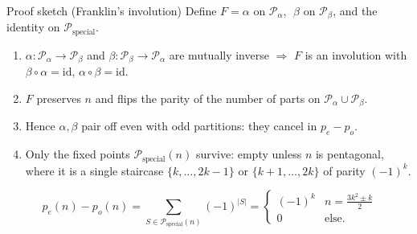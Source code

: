 \documentclass[10pt]{beamer}
\newcommand{\PP}{\mathcal{P}}
\begin{document}
\begin{frame}{Proof sketch (Franklin's involution)}
Define $F=\alpha$ on $\PP_\alpha$, $\;\beta$ on $\PP_\beta$, and the identity on $\PP_{\mathrm{special}}$.
\begin{enumerate}
\item $\alpha:\PP_\alpha\to\PP_\beta$ and $\beta:\PP_\beta\to\PP_\alpha$ are mutually inverse
      $\Rightarrow$ $F$ is an \alert{involution} with $\beta\circ\alpha=\mathrm{id}$, $\alpha\circ\beta=\mathrm{id}$.
\item $F$ \alert{preserves $n$} and \alert{flips the parity} of the number of parts on $\PP_\alpha\cup\PP_\beta$.
\item Hence $\alpha,\beta$ pair off even with odd partitions: they cancel in $p_e-p_o$.
\item Only the \alert{fixed points} $\PP_{\mathrm{special}}(n)$ survive: empty unless $n$ is
      pentagonal, where it is a single staircase $\{k,\dots,2k{-}1\}$ or $\{k{+}1,\dots,2k\}$
      of parity $(-1)^k$.
\end{enumerate}
\[
\boxed{\,p_e(n)-p_o(n)=\sum_{S\in\PP_{\mathrm{special}}(n)}(-1)^{|S|}
=\begin{cases}(-1)^k & n=\tfrac{3k^2\pm k}2\\ 0&\text{else.}\end{cases}}
\]
\end{frame}

\end{document}
